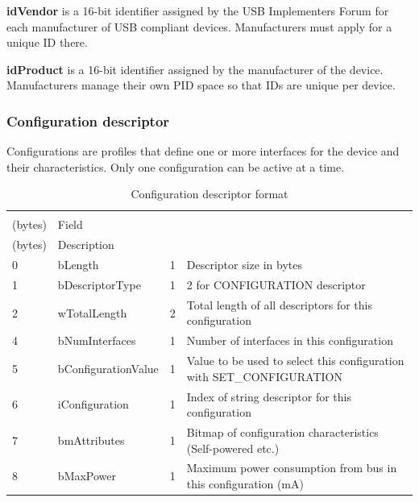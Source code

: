 \documentclass{article}
\begin{document}
{\bf idVendor} is a 16-bit identifier assigned by the USB Implementers Forum
for each manufacturer of USB compliant devices. Manufacturers must apply
for a unique ID there.

{\bf idProduct} is a 16-bit identifier assigned by the manufacturer
of the device. Manufacturers manage their own PID space so that IDs
are unique per device.



\subsubsection{Configuration descriptor}

Configurations are profiles that define one or more interfaces for the device
and their characteristics.
Only one configuration can be active at a time.
\cite[p. 244]{usbstd}

\begin{table}[H]
  \caption{Configuration descriptor format \cite[p. 265]{usbstd}}
  \centering
  \begin{tabularx}{\textwidth}{l | l | l | X}
    \begin{tabular}{@{}l} Offset \\ (bytes) \end{tabular} & Field &
    \begin{tabular}{@{}l} Size \\ (bytes) \end{tabular} & Description \\ \hline
    
    0 & bLength & 1 & Descriptor size in bytes \\
    1 & bDescriptorType & 1 & 2 for CONFIGURATION descriptor \\
    2 & wTotalLength & 2 & Total length of all descriptors for this configuration \\
    4 & bNumInterfaces & 1 & Number of interfaces in this configuration \\
    5 & bConfigurationValue & 1 & Value to be used to select this configuration with SET\_CONFIGURATION \\
    6 & iConfiguration & 1 & Index of string descriptor for this configuration \\
    7 & bmAttributes & 1 & Bitmap of configuration characteristics (Self-powered etc.) \\
    8 & bMaxPower & 1 & Maximum power consumption from bus in this configuration (mA) \\
  \end{tabularx}
\end{table}
\end{document}
